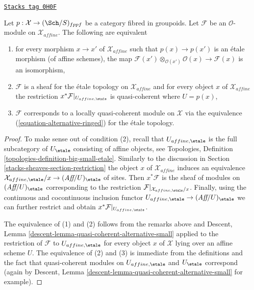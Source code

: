 \begin{lemma}
\label{stacks-sheaves-lemma-locally-quasi-coherent-alternative}
\href{https://stacks.math.columbia.edu/tag/0H0F}{\texttt{Stacks tag 0H0F}}

Let $p : \mathcal{X} \to (\Sch/S)_{fppf}$ be a category fibred in groupoids.
Let $\mathcal{F}$ be an $\mathcal{O}$-module on $\mathcal{X}_{affine}$.
The following are equivalent
\begin{enumerate}
\item for every morphism $x \to x'$ of $\mathcal{X}_{affine}$ such that
$p(x) \to p(x')$ is an \'etale morphism (of affine schemes), the map
$\mathcal{F}(x') \otimes_{\mathcal{O}(x')} \mathcal{O}(x) \to \mathcal{F}(x)$
is an isomorphism,
\item $\mathcal{F}$ is a sheaf for the \'etale topology on
$\mathcal{X}_{affine}$ and for every object $x$ of $\mathcal{X}_{affine}$
the restriction $x^*\mathcal{F}|_{U_{affine, \etale}}$ is quasi-coherent
where $U = p(x)$,
\item $\mathcal{F}$ corresponds to a locally quasi-coherent module
on $\mathcal{X}$ via the equivalence (\ref{equation-alternative-ringed})
for the \'etale topology.
\end{enumerate}
\end{lemma}

\begin{proof}
To make sense out of condition (2), recall that $U_{affine, \etale}$
is the full subcategory of $U_\etale$ consisting of affine objects, see
Topologies, Definition \ref{topologies-definition-big-small-etale}.
Similarly to the discussion in Section \ref{stacks-sheaves-section-restriction}
the object $x$ of $\mathcal{X}_{affine}$ induces an equivalence
$\mathcal{X}_{affine, \etale}/x \to (\textit{Aff}/U)_\etale$ of sites.
Then $x^*\mathcal{F}$ is the sheaf of modules on $(\textit{Aff}/U)_\etale$
corresponding to the restriction
$\mathcal{F}|_{\mathcal{X}_{affine, \etale}/x}$.
Finally, using the continuous and cocontinuous inclusion functor
$U_{affine, \etale} \to (\textit{Aff}/U)_\etale$ we can further
restrict and obtain $x^*\mathcal{F}|_{U_{affine, \etale}}$.

\medskip\noindent
The equivalence of (1) and (2) follows from the remarks above and
Descent, Lemma \ref{descent-lemma-quasi-coherent-alternative-small}
applied to the restriction of $\mathcal{F}$ to $U_{affine, \etale}$
for every object $x$ of $\mathcal{X}$ lying over an affine scheme $U$.
The equivalence of (2) and (3) is immediate from the definitions
and the fact that quasi-coherent modules on $U_{affine, \etale}$
and $U_\etale$ correspond (again by
Descent, Lemma \ref{descent-lemma-quasi-coherent-alternative-small}
for example).
\end{proof}

